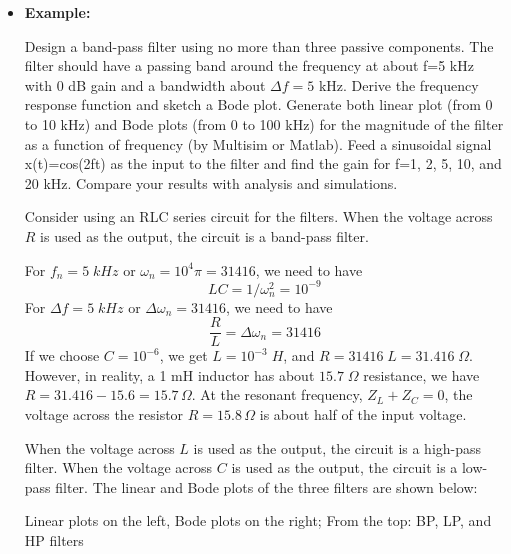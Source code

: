 
\usepackage{html}



\begin{itemize}

\item {\bf Example:}


Design a band-pass filter using no more than three passive components. The 
filter should have a passing band around the frequency at about f=5 kHz
with 0 dB gain and a bandwidth about $\Delta f=5$ kHz. Derive the frequency 
response function and sketch a Bode plot. Generate both linear plot (from 0 
to 10 kHz) and Bode plots (from 0 to 100 kHz) for the magnitude of the filter 
as a function of frequency (by Multisim or Matlab). Feed a sinusoidal signal 
x(t)=cos(2\pi ft) as the input to the filter and find the gain for f=1, 2, 5, 10,  
and 20 kHz. Compare your results with analysis and simulations. 



Consider using an RLC series circuit for the filters. When the voltage
across $R$ is used as the output, the circuit is a band-pass filter.

For $f_n=5\;kHz$ or $\omega_n=10^4 \pi =31416$, we need to have
\[
LC=1/\omega_n^2=10^{-9}
\]
For $\Delta f=5\;kHz$ or $\Delta\omega_n=31416$, we need to have
\[
\frac{R}{L}=\Delta\omega_n=31416
\]
If we choose $C=10^{-6}$, we get $L=10^{-3}\;H$, and $R=31416\;L=31.416\;\Omega$.
However, in reality, a 1 mH inductor has about $15.7\;\Omega$ resistance,
we have $R=31.416-15.6=15.7\,\Omega$. At the resonant frequency, $Z_L+Z_C=0$,
the voltage across the resistor $R=15.8\,\Omega$ is about half of the input
voltage.

When the voltage across $L$ is used as the output, the circuit is a high-pass filter.
When the voltage across $C$ is used as the output, the circuit is a low-pass filter.
The linear and Bode plots of the three filters are shown below:


Linear plots on the left, Bode plots on the right; From the top: BP, LP, and HP
filters

\end{itemize}



